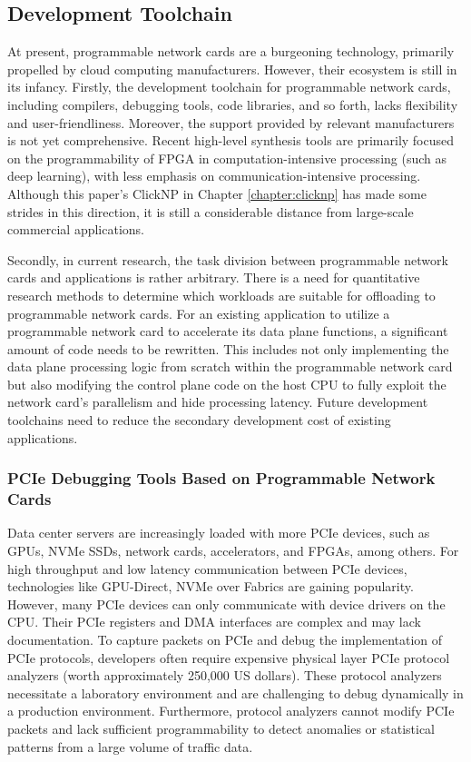 \subsection{Development Toolchain}
\label{future:toolchain}

At present, programmable network cards are a burgeoning technology, primarily propelled by cloud computing manufacturers. However, their ecosystem is still in its infancy. Firstly, the development toolchain for programmable network cards, including compilers, debugging tools, code libraries, and so forth, lacks flexibility and user-friendliness. Moreover, the support provided by relevant manufacturers is not yet comprehensive. Recent high-level synthesis tools are primarily focused on the programmability of FPGA in computation-intensive processing (such as deep learning), with less emphasis on communication-intensive processing. Although this paper's ClickNP in Chapter \ref{chapter:clicknp} has made some strides in this direction, it is still a considerable distance from large-scale commercial applications.

Secondly, in current research, the task division between programmable network cards and applications is rather arbitrary. There is a need for quantitative research methods to determine which workloads are suitable for offloading to programmable network cards. For an existing application to utilize a programmable network card to accelerate its data plane functions, a significant amount of code needs to be rewritten. This includes not only implementing the data plane processing logic from scratch within the programmable network card but also modifying the control plane code on the host CPU to fully exploit the network card's parallelism and hide processing latency. Future development toolchains need to reduce the secondary development cost of existing applications.

\subsubsection{PCIe Debugging Tools Based on Programmable Network Cards}
\label{future:pcie-debugger}

Data center servers are increasingly loaded with more PCIe devices, such as GPUs, NVMe SSDs, network cards, accelerators, and FPGAs, among others. For high throughput and low latency communication between PCIe devices, technologies like GPU-Direct, NVMe over Fabrics are gaining popularity. However, many PCIe devices can only communicate with device drivers on the CPU. Their PCIe registers and DMA interfaces are complex and may lack documentation. To capture packets on PCIe and debug the implementation of PCIe protocols, developers often require expensive physical layer PCIe protocol analyzers (worth approximately 250,000 US dollars). These protocol analyzers necessitate a laboratory environment and are challenging to debug dynamically in a production environment. Furthermore, protocol analyzers cannot modify PCIe packets and lack sufficient programmability to detect anomalies or statistical patterns from a large volume of traffic data.

